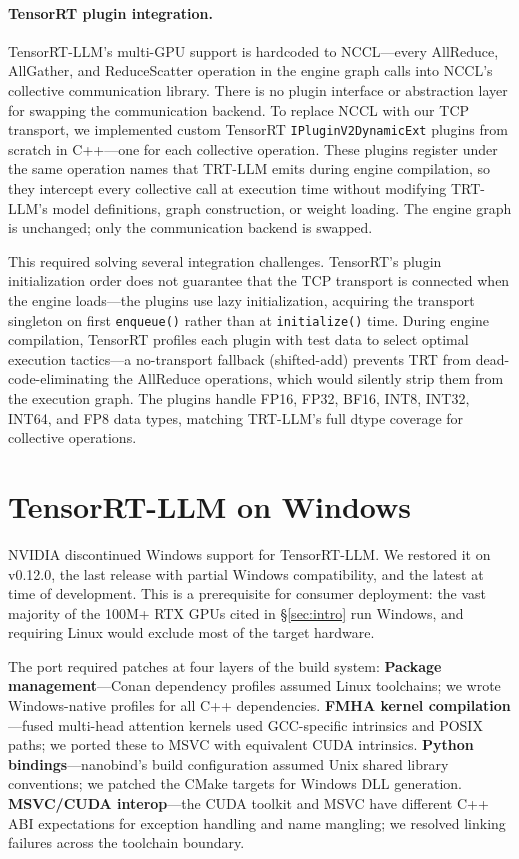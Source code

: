 \documentclass[10pt,twocolumn]{article}
\begin{document}
\paragraph{TensorRT plugin integration.}
TensorRT-LLM's multi-GPU support is hardcoded to NCCL---every AllReduce,
AllGather, and ReduceScatter operation in the engine graph calls into
NCCL's collective communication library.  There is no plugin interface or
abstraction layer for swapping the communication backend.  To replace NCCL
with our TCP transport, we implemented custom TensorRT
\texttt{IPluginV2DynamicExt} plugins from scratch in C++---one for each
collective operation.  These plugins register under the same operation
names that TRT-LLM emits during engine compilation, so they intercept
every collective call at execution time without modifying TRT-LLM's model
definitions, graph construction, or weight loading.  The engine graph is
unchanged; only the communication backend is swapped.

This required solving several integration challenges.  TensorRT's plugin
initialization order does not guarantee that the TCP transport is connected
when the engine loads---the plugins use lazy initialization, acquiring the
transport singleton on first \texttt{enqueue()} rather than at
\texttt{initialize()} time.  During engine compilation, TensorRT profiles
each plugin with test data to select optimal execution tactics---a
no-transport fallback (shifted-add) prevents TRT from
dead-code-eliminating the AllReduce operations, which would silently strip
them from the execution graph.  The plugins handle FP16, FP32, BF16, INT8,
INT32, INT64, and FP8 data types, matching TRT-LLM's full dtype coverage
for collective operations.

\section{TensorRT-LLM on Windows}\label{sec:windows}

NVIDIA discontinued Windows support for TensorRT-LLM\@.  We restored it on
v0.12.0, the last release with partial Windows compatibility, and the
latest at time of development.  This is a prerequisite for consumer
deployment: the vast majority of the 100M+ RTX GPUs cited in
\S\ref{sec:intro} run Windows, and requiring Linux would exclude most of
the target hardware.

The port required patches at four layers of the build system:
\textbf{Package management}---Conan dependency profiles assumed Linux
toolchains; we wrote Windows-native profiles for all C++ dependencies.
\textbf{FMHA kernel compilation}---fused multi-head attention kernels used
GCC-specific intrinsics and POSIX paths; we ported these to MSVC with
equivalent CUDA intrinsics.
\textbf{Python bindings}---nanobind's build configuration assumed Unix
shared library conventions; we patched the CMake targets for Windows DLL
generation.
\textbf{MSVC/CUDA interop}---the CUDA toolkit and MSVC have different C++
ABI expectations for exception handling and name mangling; we resolved
linking failures across the toolchain boundary.
\end{document}
